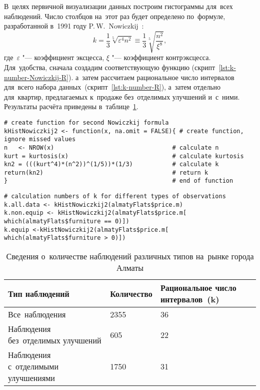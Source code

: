 \documentclass[]{scrartcl}
\begin{document}
В~целях первичной визуализации данных построим гистограммы для~всех наблюдений. Число столбцов на~этот раз будет определено по~формуле, разработанной в~1991 году P.\,W.~Nowiczkij~\cite{Nowiczkij:oczenka-pogresh}:
\begin{equation}\label{eq:k-hist_Nowiczkij}
k = \frac{1}{3}\sqrt[5]{\varepsilon^4 n^2} \equiv \frac{1}{3} \sqrt[5]{\frac{n^2}{\xi^8}}, 
\end{equation}
где~$\varepsilon$ "--- коэффициент эксцесса, $\xi$ "--- коэффициент контрэксцесса. Для~удобства, сначала создадим соответствующую функцию (скрипт~\ref{lst:k-number-Nowiczkij-R}). а~затем рассчитаем рациональное число интервалов для~всего набора данных~(скрипт~\ref{lst:k-number-R}), а~затем отдельно для~квартир, предлагаемых к~продаже без~отделимых улучшений и~с~ними. Результаты расчёта приведены в~таблице~\ref{tab:numbers-of-observations-almaty-R}.
%
\begin{lstlisting}[float, caption = Создание функции для~расчёта~k по~формуле P.\,W.~Nowiczkij, firstnumber=1, label= lst:k-number-Nowiczkij-R]
# create function for second Nowiczkij formula
kHistNowiczkij2 <- function(x, na.omit = FALSE){ # create function, ignore missed values
n   <- NROW(x)                                 # calculate n
kurt = kurtosis(x)                             # calculate kurtosis
kn2 = (((kurt^4)*(n^2))^(1/5))*(1/3)           # calculate k
return(kn2)                                    # return k  
}                                              # end of function
\end{lstlisting} 
%
\begin{lstlisting}[float, caption = Расчёт~k по~формуле P.\,W.~Nowiczkij для~наблюдений различных типов, firstnumber=1, label= lst:k-number-R]
# calculation numbers of k for different types of observations
k.all.data <- kHistNowiczkij2(almatyFlats$price.m)
k.non.equip <- kHistNowiczkij2(almatyFlats$price.m[ which(almatyFlats$furniture == 0)])
k.equip <-kHistNowiczkij2(almatyFlats$price.m[ which(almatyFlats$furniture > 0)])                                       
\end{lstlisting}
%
\begin{table}[ht]
	\caption{Сведения о~количестве наблюдений различных типов на~рынке города Алматы}\label{tab:numbers-of-observations-almaty-R}
	\centering
	\begin{tabular}{lll}
		\hline
		Тип наблюдений&Количество&Рациональное число интервалов~(k)\\
		\hline
		Все~наблюдения&2355&36\\
		\hline
		Наблюдения без~отделимых улучшений&605&22\\
		\hline
		Наблюдения с~отделимыми улучшениями&1750&31\\
		\hline
	\end{tabular}
\end{table}
%
\end{document}

